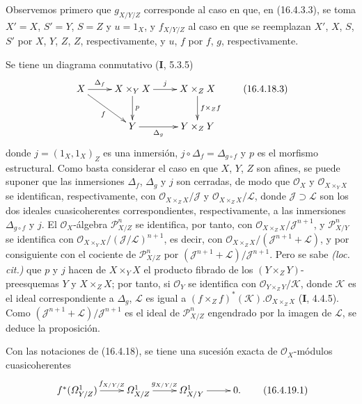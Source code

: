 Observemos primero que $g_{X/Y/Z}$ corresponde al caso en que, en (16.4.3.3), se toma
$X'=X$, $S'=Y$, $S=Z$ y $u=1_X$, y $f_{X/Y/Z}$ al caso en que se reemplazan
$X'$, $X$, $S$, $S'$ por $X$, $Y$, $Z$, $Z$, respectivamente, y $u$, $f$ por
$f$, $g$, respectivamente.

Se tiene un diagrama conmutativo (\textbf I, 5.3.5)
\[
  \xymatrix{
    X\ar[r]^-{\Delta_f}\ar[dr]_-f
      &X\times_Y X\ar[d]^-p\ar[r]^-j
      &X\times_Z X\ar[d]^-{f\times_Z f}\\
    &Y\ar[r]_-{\Delta_g}&Y\times_Z Y
  }
  \tag{16.4.18.3}
  \label{IV.16.4.18.3}
\]
donde $j=(1_X,1_X)_Z$ es una inmersión, $j\circ\Delta_f=\Delta_{g\circ f}$ y
$p$ es el morfismo estructural. Como basta considerar el caso en que $X$, $Y$,
$Z$ son afines, se puede suponer que las inmersiones $\Delta_f$, $\Delta_g$ y
$j$ son cerradas, de modo que $\mathcal{O}_X$ y
$\mathcal{O}_{X\times_Y X}$ se identifican, respectivamente, con
$\mathcal{O}_{X\times_Z X}/\mathscr{J}$ y
$\mathcal{O}_{X\times_Z X}/\mathscr{L}$, donde
$\mathscr{J}\supset\mathscr{L}$ son los dos ideales cuasicoherentes
correspondientes, respectivamente, a las inmersiones $\Delta_{g\circ f}$ y $j$. El
$\mathcal{O}_X$-álgebra $\mathscr{P}_{X/Z}^n$ se identifica, por tanto, con
$\mathcal{O}_{X\times_Z X}/\mathscr{J}^{n+1}$, y
$\mathscr{P}_{X/Y}^n$ se identifica con
$\mathcal{O}_{X\times_Y X}/(\mathscr{J}/\mathscr{L})^{n+1}$, es decir, con
$\mathcal{O}_{X\times_Z X}/(\mathscr{J}^{n+1}+\mathscr{L})$, y por consiguiente con el
cociente de $\mathscr{P}_{X/Z}^n$ por
$(\mathscr{J}^{n+1}+\mathscr{L})/\mathscr{J}^{n+1}$. Pero se sabe
\emph{(loc. cit.)} que $p$ y $j$ hacen de $X\times_Y X$ el producto fibrado de los
$(Y\times_Z Y)$-preesquemas $Y$ y $X\times_Z X$; por tanto, si $\mathcal{O}_Y$ se
identifica con $\mathcal{O}_{Y\times_Z Y}/\mathscr{K}$, donde $\mathscr{K}$ es
el ideal correspondiente a $\Delta_g$, $\mathscr{L}$ es igual a
$(f\times_Z f)^*(\mathscr{K}).\mathcal{O}_{X\times_Z X}$ (\textbf I, 4.4.5).
Como $(\mathscr{J}^{n+1}+\mathscr{L})/\mathscr{J}^{n+1}$ es el ideal de
$\mathscr{P}_{X/Z}^n$ engendrado por la imagen de $\mathscr{L}$, se deduce la
proposición.

\begin{corollary}[16.4.19]
\label{IV.16.4.19}
Con las notaciones de \textup{(16.4.18)}, se tiene una sucesión exacta de
$\mathcal{O}_X$-módulos cuasicoherentes
\[
  \xymatrix{
    f^*(\varOmega_{Y/Z}^1)\ar[r]^-{f_{X/Y/Z}}&
    \varOmega_{X/Z}^1\ar[r]^-{g_{X/Y/Z}}&
    \varOmega_{X/Y}^1\ar[r]&0.
  }
  \tag{16.4.19.1}
  \label{IV.16.4.19.1}
\]
\end{corollary}

